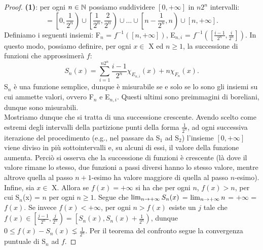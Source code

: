 \documentclass[Completo.tex]{subfiles}
\begin{document}
\begin{proof}
	\textbf{(1)}: per ogni $n \in \bb[N]$ possiamo suddividere $[0, +\infty]$ in $n 2^n$ intervalli:
	\begin{equation*}
	[0, +\infty] = \left[0, \frac{1}{2^n}\right) \cup \left[\frac{1}{2^n}, \frac{2}{2^n}\right) \cup ... \cup \left[n-\frac{1}{2^n},n\right) \cup [n, +\infty].
	\end{equation*}
	Definiamo i seguenti insiemi: F$_n$ = $f^{-1}([n, +\infty])$, E$_{n,i}$ = $f^{-1}(\left[\frac{i-1}{2^n}, \frac{i}{2^n}\right])$. In questo modo, possiamo definire, per ogni $x \in$ X ed $n\geq1$, la successione di funzioni che approssimerà $f$:
	\begin{equation*}
	S_n(x) = \sum\limits_{i=1}^{n2^n}\frac{i-1}{2^n} \chi_{E_{n,i}}(x) + n\chi_{F_n}(x).
	\end{equation*}
	S$_n$ è una funzione semplice, dunque è misurabile se e solo se lo sono gli insiemi su cui ammette valori, ovvero F$_n$ e E$_{n,i}$. Questi ultimi sono preimmagini di boreliani, dunque sono misurabili. \\
	Mostriamo dunque che si tratta di una successione crescente. Avendo scelto come estremi degli intervalli della partizione punti della forma $\frac{1}{2^n}$, ad ogni successiva iterazione del procedimento (e.g., nel passare da S$_1$ ad S$_2$) l'insieme $[0, +\infty]$ viene diviso in più sottointervalli e, su alcuni di essi, il valore della funzione aumenta. Perciò si osserva che la successione di funzioni è crescente (là dove il valore rimane lo stesso, due funzioni a passi diversi hanno lo stesso valore, mentre altrove quella al passo $n+1$-esimo ha valore maggiore di quella al passo $n$-esimo). \\
	Infine, sia $x \in$ X. Allora se $f(x) = +\infty$ si ha che per ogni $n$, $f(x) > n$, per cui S$_n$(x) = $n$ per ogni $n\geq1$. Segue che $\lim_{n \rightarrow +\infty}S_n(x)$ = $\lim_{n \rightarrow +\infty} n$ = $+\infty$ = $f(x)$. Se invece $f(x) < +\infty$, per ogni $n > f(x)$ esiste un $j$ tale che $f(x) \in \left[\frac{j-1}{2^n}, \frac{j}{2^n}\right) = \left[S_n(x), S_n(x) + \frac{1}{2^n}\right)$, dunque $0 \leq f(x) - S_n(x) \lneq \frac{1}{2^n}$. Per il teorema del confronto segue la convergenza puntuale di S$_n$ ad $f$.
\end{proof}
\end{document}
